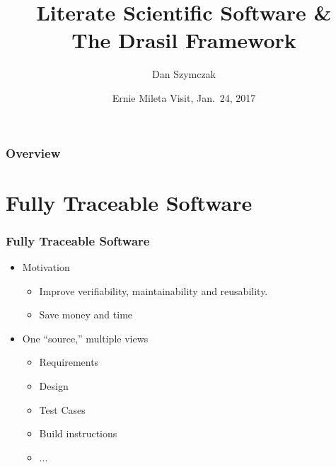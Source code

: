 \documentclass{beamer}
\title[\pgfuseimage{logo}]  %
{Literate Scientific Software \&\\ The Drasil Framework}
\author[Slide \thepage~of \pageref{TotPages}] %
{Dan Szymczak}
\institute[McMaster University] %
{
  Computing and Software Department\\
  Faculty of Engineering\\
  McMaster University
}
\date[Jan 12, 2016] %
{Ernie Mileta Visit, Jan.\ 24, 2017}
\begin{document}
\begin{frame}

\titlepage

\end{frame}


\begin{frame}

\frametitle{Overview}
\tableofcontents


\end{frame}


\section[FTS]{Fully Traceable Software} %



\begin{frame}

\frametitle{Fully Traceable Software}

\begin{itemize}
\item Motivation
\begin{itemize}
\item Improve verifiability, maintainability and reusability.
\item Save money and time%
\end{itemize}
\item One ``source,'' multiple views
\begin{itemize}
\item Requirements%
\item Design
\item Test Cases
\item Build instructions
\item ...
\end{itemize}
\end{itemize}
\end{frame}
\end{document}
